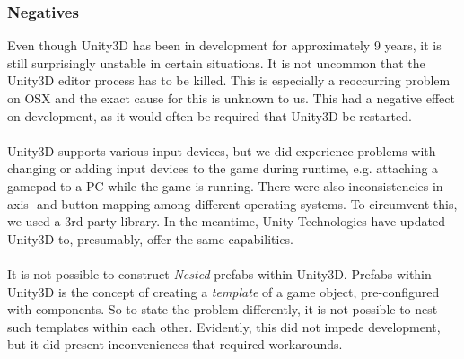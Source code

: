 \subsubsection*{Negatives}
Even though Unity3D has been in development for approximately 9 years, it is
still surprisingly unstable in certain situations\cite{unity-facts}. It is not uncommon that the
Unity3D editor process has to be killed. This is especially a
reoccurring problem on OSX and the exact cause for this is unknown to us. This
had a negative effect on development, as it would often be required that Unity3D
be restarted.
\\
\\
Unity3D supports various input devices, but we did experience problems with
changing or adding input devices to the game during runtime, e.g. attaching a
gamepad to a PC while the game is running. There were also inconsistencies in
axis- and button-mapping among different operating systems. To circumvent this,
we used a 3rd-party library. In the meantime, Unity Technologies have updated
Unity3D to, presumably, offer the same capabilities.
\\
\\
It is not possible to construct \textit{Nested} prefabs within Unity3D. Prefabs
within Unity3D is the concept of creating a \textit{template} of a game object,
pre-configured with components. So to state the problem differently, it is not
possible to nest such templates within each other. Evidently, this did not
impede development, but it did present inconveniences that required
workarounds.


%

